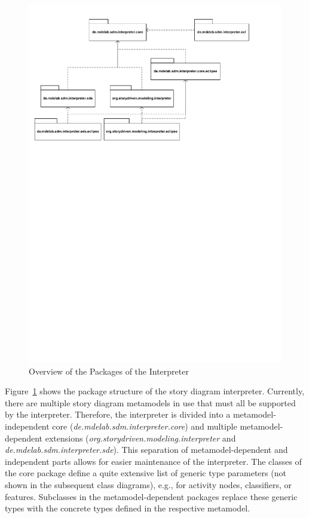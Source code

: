 \begin{figure}[htb]
  \centering
  \includegraphics[width=1.0\columnwidth]{./figures/interpreter_packages.pdf}
  \caption{Overview of the Packages of the Interpreter}
  \label{fig:interpreter_packages}
\end{figure}

Figure~\ref{fig:interpreter_packages} shows the package structure of the story diagram interpreter.
Currently, there are multiple story diagram metamodels in use that must all be supported by the interpreter. 
Therefore, the interpreter is divided into a metamodel-independent core (\emph{de.mdelab.sdm.interpreter.core}) and multiple metamodel-dependent extensions (\emph{org.storydriven.modeling.interpreter} and \emph{de.mdelab.sdm.interpreter.sde}). 
This separation of metamodel-dependent and independent parts allows for easier maintenance of the interpreter. 
The classes of the core package define a quite extensive list of generic type parameters (not shown in the subsequent class diagrams), e.g., for activity nodes, classifiers, or features. 
Subclasses in the metamodel-dependent packages replace these generic types with the concrete types defined in the respective metamodel.

